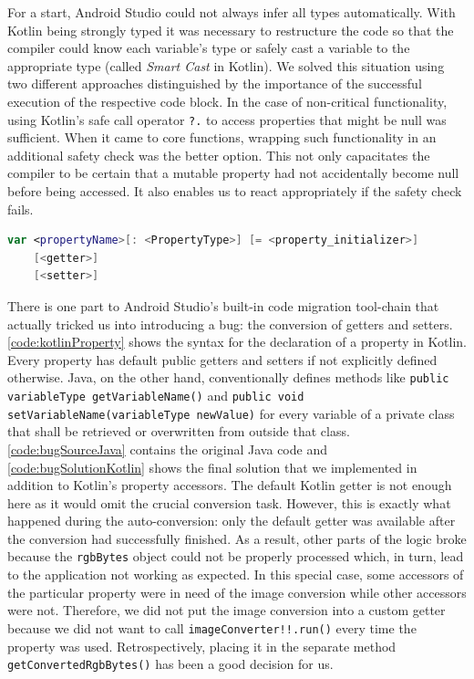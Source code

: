 \documentclass[
			   fontsize=11pt,
               paper=a4,
               bibliography=totoc,
               idxtotoc,
               headsepline,
               footsepline,
               footinclude=false,
               BCOR=12mm,
               DIV=13,
               openany,   %
               ]
               {scrbook}
\newcommand{\code}[1]{\lstinline[basicstyle = \ttfamily\small]{#1}} %
\begin{document}
For a start, Android Studio could not always infer all types automatically. With Kotlin being strongly typed it was necessary to restructure the code so that the compiler could know each variable's type or safely cast a variable to the appropriate type (called \textit{Smart Cast} in Kotlin). We solved this situation using two different approaches distinguished by the importance of the successful execution of the respective code block. In the case of non-critical functionality, using Kotlin's safe call operator \code{?.} to access properties that might be null was sufficient. When it came to core functions, wrapping such functionality in an additional safety check was the better option. This not only capacitates the compiler to be certain that a mutable property had not accidentally become null before being accessed. It also enables us to react appropriately if the safety check fails. \\

\begin{lstlisting}[style=standard, language=Kotlin, label=code:kotlinProperty, caption={Kotlin's declaration syntax for a mutable property. Getter and setter are optional. The property type is only optional when the compiler can infer it from the context (meaning either from the initializer or from the return type of the getter).}]
var <propertyName>[: <PropertyType>] [= <property_initializer>]
	[<getter>]
	[<setter>]
\end{lstlisting}

There is one part to Android Studio's built-in code migration tool-chain that actually tricked us into introducing a bug: the conversion of getters and setters. \autoref{code:kotlinProperty} shows the syntax for the declaration of a property in Kotlin. Every property has default public getters and setters if not explicitly defined otherwise. Java, on the other hand, conventionally defines methods like \code{public variableType getVariableName()} and \code{public void setVariableName(variableType newValue)} for every variable of a private class that shall be retrieved or overwritten from outside that class. \\

\autoref{code:bugSourceJava} contains the original Java code and \autoref{code:bugSolutionKotlin} shows the final solution that we implemented in addition to Kotlin's property accessors. The default Kotlin getter is not enough here as it would omit the crucial conversion task. However, this is exactly what happened during the auto-conversion: only the default getter was available after the conversion had successfully finished. As a result, other parts of the logic broke because the \code{rgbBytes} object could not be properly processed which, in turn, lead to the application not working as expected. In this special case, some accessors of the particular property were in need of the image conversion while other accessors were not. Therefore, we did not put the image conversion into a custom getter because we did not want to call \code{imageConverter!!.run()} every time the property was used. Retrospectively, placing it in the separate method \code{getConvertedRgbBytes()} has been a good decision for us.
\end{document}
